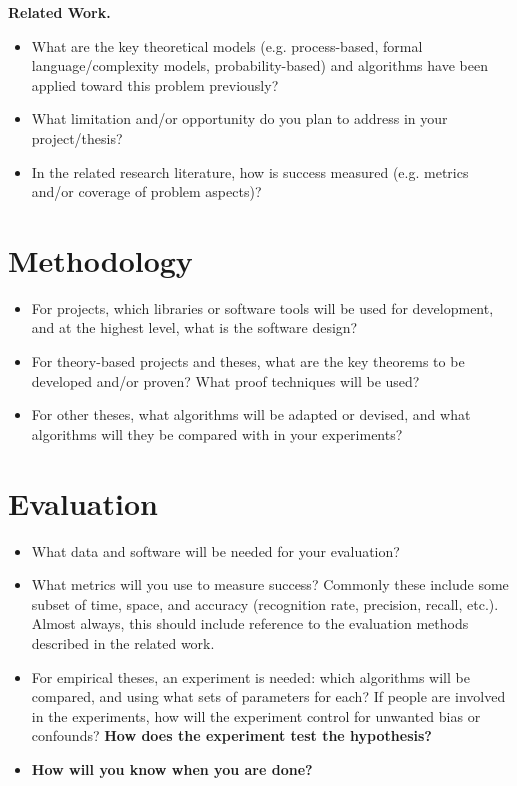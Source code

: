 \documentclass[11pt]{artikel3}
\begin{document}
{\bf Related Work.}
\begin{itemize}
  \item What are the key theoretical models (e.g. process-based, formal language/complexity models, probability-based) and algorithms have been applied toward this problem previously? 
  \item What limitation and/or opportunity do you plan to address in your project/thesis?
  \item
In the related research literature, how is success measured (e.g. metrics and/or coverage of problem aspects)?
\end{itemize}




\section{Methodology}




\begin{itemize}
\item For projects, which libraries or software tools will be used for development, and at the highest level, what is the software design?
\item For theory-based projects and theses, what are the key theorems to be developed and/or proven? What proof techniques will be used?
\item For other theses, what algorithms will be adapted or devised, and what algorithms will they be compared with in your experiments?
\end{itemize}




\section{Evaluation}




\begin{itemize}
\item What data and software will be needed for your evaluation? 
\item What metrics
will you use to measure success? Commonly these include some subset of time, space, and accuracy (recognition rate, precision, recall, etc.).
Almost always, this should include reference to the evaluation methods described in the related work.
\item For empirical theses, an experiment is needed: which algorithms will be compared, and using what sets of parameters for each? If people are involved in the experiments, how will the experiment control for unwanted bias or confounds? {\bf How does the experiment test the hypothesis?}
\item {\bf How will you know when you are done?}
\end{itemize}
\end{document}
